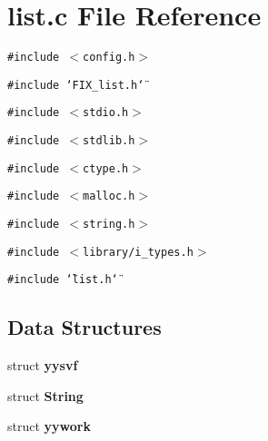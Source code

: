 \section{list.c File Reference}
\label{list_8c}
{\tt \#include $<$config.h$>$}\par
{\tt \#include \char`\"{}FIX\_\-list.h\char`\"{}}\par
{\tt \#include $<$stdio.h$>$}\par
{\tt \#include $<$stdlib.h$>$}\par
{\tt \#include $<$ctype.h$>$}\par
{\tt \#include $<$malloc.h$>$}\par
{\tt \#include $<$string.h$>$}\par
{\tt \#include $<$library/i\_\-types.h$>$}\par
{\tt \#include \char`\"{}list.h\char`\"{}}\par
\subsection*{Data Structures}
\begin{CompactItemize}
\item 
struct \bf{yysvf}
\item 
struct \bf{String}
\item 
struct \bf{yywork}
\end{CompactItemize}
